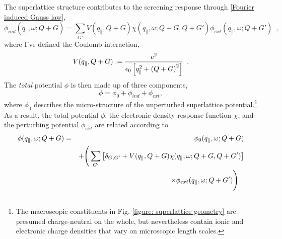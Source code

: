 The superlattice structure contributes to the screening response through \eqref{Fourier induced Gauss law},
\begin{equation}
     \phi_{ind}(q_\parallel,\omega;Q+G) = \sum_{G'}V(q_\parallel,Q+G)\chi(q_\parallel,\omega;Q+G, Q+G')
     \phi_{ext}(q_\parallel,\omega;Q+G')
     \,\,\,,
\end{equation}
where I've defined the Coulomb interaction,
\begin{equation}
    V(q_\parallel,Q+G):=
    \frac{e^2}{\epsilon_0\left[ q_\parallel^2+\left( Q+G\right)^2\right]}
    \,\,\,.
\end{equation}
The {\it total} potential $\phi$ is then made up of three components,
\begin{equation}
    \phi = \phi_0 + \phi_{ind} + \phi_{ext},
\end{equation}
where $\phi_0$ describes the micro-structure of the unperturbed superlattice potential.\footnote{The macroscopic constituents in Fig. \ref{figure: superlattice geometry} are presumed charge-neutral on the whole, but nevertheless contain ionic and electronic charge densities that vary on microscopic length scales.}  As a result, the total potential $\phi$, the electronic density response function $\chi$, and the perturbing potential $\phi_{ext}$ are related according to
\begin{eqnarray}
    \label{microscopic total potential expression}
    \nonumber 
    \phi(q_\parallel,\omega;Q+G) 
    &=&
    \phi_0(q_\parallel, \omega; Q+G) 
    \\ \nonumber &\,& +
    \Bigg(\sum_{G'}
    \left[
    \delta_{G,G'}
    +
    V(q_\parallel,Q+G)
    \chi(q_\parallel,\omega;Q+G, Q+G')
    \right]
    \\ &\,&
    \times
    \phi_{ext}(q_\parallel,\omega;Q+ G')\Bigg)
    \,\,\,.
\end{eqnarray}

